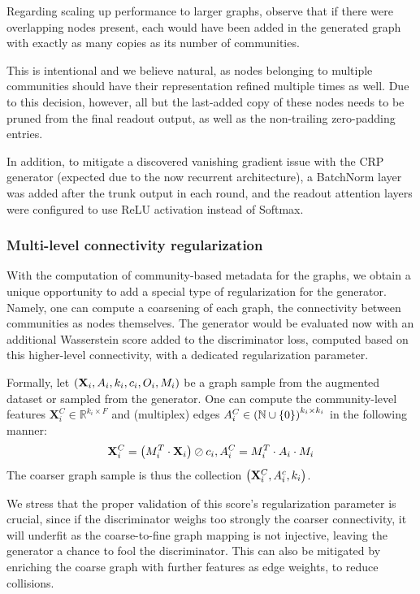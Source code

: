 Regarding scaling up performance to larger graphs, observe that if there were overlapping nodes present, each would have been added in the generated graph with exactly as many copies as its number of communities. 

This is intentional and we believe natural, as nodes belonging to multiple communities should have their representation refined multiple times as well. Due to this decision, however, all but the last-added copy of these nodes needs to be pruned from the final readout output, as well as the non-trailing zero-padding entries.

In addition, to mitigate a discovered vanishing gradient issue with the CRP generator (expected due to the now recurrent architecture), a BatchNorm layer was added after the trunk output in each round, and the readout attention layers were configured to use ReLU activation instead of Softmax.

\subsubsection{Multi-level connectivity regularization}
With the computation of community-based metadata for the graphs, we obtain a unique opportunity to add a special type of regularization for the generator. Namely, one can compute a coarsening of each graph, the connectivity between communities as nodes themselves. The generator would be evaluated now with an additional Wasserstein score added to the discriminator loss, computed based on this higher-level connectivity, with a dedicated regularization parameter. 

Formally, let $\mathopen{}\left(\mathbf{X}_i, A_i, k_i, c_i, O_i, M_i\right)$ be a graph sample from the augmented dataset or sampled from the generator. One can compute the community-level features $\mathbf{X}^C_i \in \mathbb{R}^{k_i \times F}$ and (multiplex) edges $A^C_i \in \mathopen{}\left(\mathbb{N} \cup \mathopen{}\left\{0\right\}\right)^{k_i \times k_i}$ in the following manner: 
\begin{equation}
\mathbf{X}^C_i = \mathopen{}\left(M^T_i \cdot \mathbf{X}_i\right) \oslash c_i, A^C_i = M^T_i \cdot A_i \cdot M_i    
\end{equation}
The coarser graph sample is thus the collection $\mathopen{}\left(\mathbf{X}^C_i, A^c_i, k_i\right)$.

We stress that the proper validation of this score's regularization parameter is crucial, since if the discriminator weighs too strongly the coarser connectivity, it will underfit as the coarse-to-fine graph mapping is not injective, leaving the generator a chance to fool the discriminator. This can also be mitigated by enriching the coarse graph with further features as edge weights, to reduce collisions.

